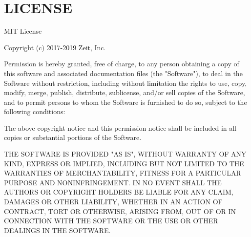 \chapter{LICENSE}
\hypertarget{md_node__modules_2ts-node_2node__modules_2arg_2_l_i_c_e_n_s_e}{}\label{md_node__modules_2ts-node_2node__modules_2arg_2_l_i_c_e_n_s_e}
MIT License

Copyright (c) 2017-\/2019 Zeit, Inc.

Permission is hereby granted, free of charge, to any person obtaining a copy of this software and associated documentation files (the "{}\+Software"{}), to deal in the Software without restriction, including without limitation the rights to use, copy, modify, merge, publish, distribute, sublicense, and/or sell copies of the Software, and to permit persons to whom the Software is furnished to do so, subject to the following conditions\+:

The above copyright notice and this permission notice shall be included in all copies or substantial portions of the Software.

THE SOFTWARE IS PROVIDED "{}\+AS IS"{}, WITHOUT WARRANTY OF ANY KIND, EXPRESS OR IMPLIED, INCLUDING BUT NOT LIMITED TO THE WARRANTIES OF MERCHANTABILITY, FITNESS FOR A PARTICULAR PURPOSE AND NONINFRINGEMENT. IN NO EVENT SHALL THE AUTHORS OR COPYRIGHT HOLDERS BE LIABLE FOR ANY CLAIM, DAMAGES OR OTHER LIABILITY, WHETHER IN AN ACTION OF CONTRACT, TORT OR OTHERWISE, ARISING FROM, OUT OF OR IN CONNECTION WITH THE SOFTWARE OR THE USE OR OTHER DEALINGS IN THE SOFTWARE. 